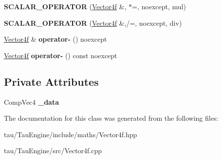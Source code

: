 \begin{DoxyCompactItemize}
\item 
\mbox{\label{class_vector4f_a2a321a58306f440100ccd06476240f8a}} 
{\bfseries S\+C\+A\+L\+A\+R\+\_\+\+O\+P\+E\+R\+A\+T\+OR} (\mbox{\hyperlink{class_vector4f}{Vector4f}} \&, $\ast$=, noexcept, mul)
\item 
\mbox{\label{class_vector4f_ae5b22c2e45fa4fe252bbc94237ebf868}} 
{\bfseries S\+C\+A\+L\+A\+R\+\_\+\+O\+P\+E\+R\+A\+T\+OR} (\mbox{\hyperlink{class_vector4f}{Vector4f}} \&,/=, noexcept, div)
\item 
\mbox{\label{class_vector4f_a1581ff3320c54064f9df880cd07f839f}} 
\mbox{\hyperlink{class_vector4f}{Vector4f}} \& {\bfseries operator-\/} () noexcept
\item 
\mbox{\label{class_vector4f_a7e1093bae8853fbab2254bf91994f715}} 
\mbox{\hyperlink{class_vector4f}{Vector4f}} {\bfseries operator-\/} () const noexcept
\end{DoxyCompactItemize}
\subsection*{Private Attributes}
\begin{DoxyCompactItemize}
\item 
\mbox{\label{class_vector4f_a57eb4a4bba03f0e6e37c61e6b11b9064}} 
Comp\+Vec4 {\bfseries \+\_\+data}
\end{DoxyCompactItemize}


The documentation for this class was generated from the following files\+:\begin{DoxyCompactItemize}
\item 
tau/\+Tau\+Engine/include/maths/Vector4f.\+hpp\item 
tau/\+Tau\+Engine/src/Vector4f.\+cpp\end{DoxyCompactItemize}
